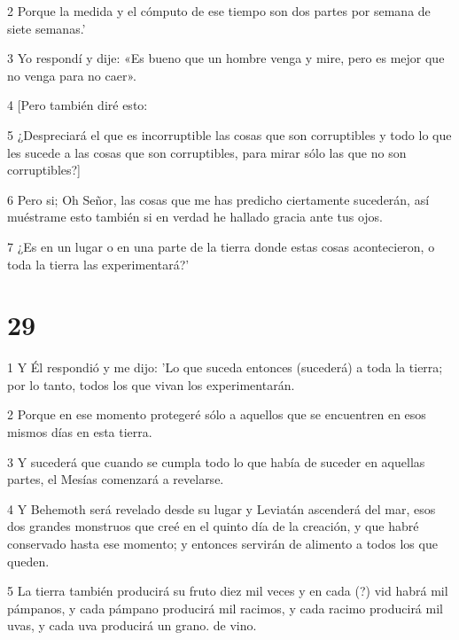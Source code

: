 \par 2 Porque la medida y el cómputo de ese tiempo son dos partes por semana de siete semanas.'

\par 3 Yo respondí y dije: «Es bueno que un hombre venga y mire, pero es mejor que no venga para no caer».

\par 4 [Pero también diré esto:

\par 5 ¿Despreciará el que es incorruptible las cosas que son corruptibles y todo lo que les sucede a las cosas que son corruptibles, para mirar sólo las que no son corruptibles?]

\par 6 Pero si; Oh Señor, las cosas que me has predicho ciertamente sucederán, así muéstrame esto también si en verdad he hallado gracia ante tus ojos.

\par 7 ¿Es en un lugar o en una parte de la tierra donde estas cosas acontecieron, o toda la tierra las experimentará?'

\chapter{29}

\par 1 Y Él respondió y me dijo: 'Lo que suceda entonces (sucederá) a toda la tierra; por lo tanto, todos los que vivan los experimentarán.

\par 2 Porque en ese momento protegeré sólo a aquellos que se encuentren en esos mismos días en esta tierra.

\par 3 Y sucederá que cuando se cumpla todo lo que había de suceder en aquellas partes, el Mesías comenzará a revelarse.

\par 4 Y Behemoth será revelado desde su lugar y Leviatán ascenderá del mar, esos dos grandes monstruos que creé en el quinto día de la creación, y que habré conservado hasta ese momento; y entonces servirán de alimento a todos los que queden.

\par 5 La tierra también producirá su fruto diez mil veces y en cada (?) vid habrá mil pámpanos, y cada pámpano producirá mil racimos, y cada racimo producirá mil uvas, y cada uva producirá un grano. de vino.

